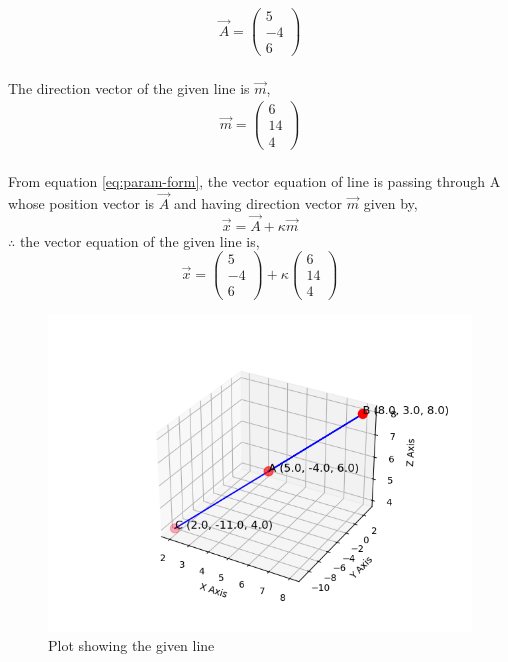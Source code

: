 \documentclass[journal]{IEEEtran}
\begin{document}
\begin{align}
\vec{A}=\begin{pmatrix}
5\\
-4\\
6
\end{pmatrix}  
\end{align}\\
The direction vector of the given line is $\vec{m}$,
\begin{align}
\vec{m}=\begin{pmatrix}
6\\
14\\
4
\end{pmatrix}  
\end{align}\\
From equation \eqref{eq:param-form}, the vector equation of line is passing through A whose position vector is $\vec{A}$ and having direction vector $\vec{m}$ given by,\\
\begin{equation}
    \vec{x}=\vec{A}+\kappa\vec{m}
\end{equation}
$\therefore$ the vector equation of the given line is,
\begin{equation*}
    \vec{x}=\begin{pmatrix}
        5\\
        -4\\
        6
    \end{pmatrix}+\kappa\begin{pmatrix}
        6\\
        14\\
        4
    \end{pmatrix}
\end{equation*}

 \begin{figure}[h!]
   \centering
   \includegraphics[width=0.7\linewidth]{figs/figure1.png}
   \caption{Plot showing the given line}
   \label{stemplot}
\end{figure}
\end{document}
